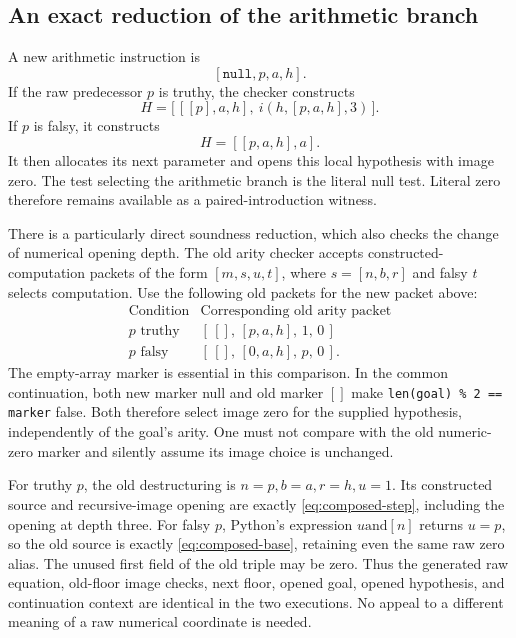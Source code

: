\subsection{An exact reduction of the arithmetic branch}

A new arithmetic instruction is
\[
                         [\mathtt{null},p,a,h].
\]
If the raw predecessor $p$ is truthy, the checker constructs
\[
 H=\bigl[\,[[p],a,h],\ i(h,[p,a,h],3)\,\bigr].
 \tag{C1}\label{eq:composed-step}
\]
If $p$ is falsy, it constructs
\[
                         H=[[p,a,h],a].
 \tag{C0}\label{eq:composed-base}
\]
It then allocates its next parameter and opens this local hypothesis
with image zero.  The test selecting the arithmetic branch is the
literal null test.  Literal zero therefore remains available as a
paired-introduction witness.

There is a particularly direct soundness reduction, which also checks
the change of numerical opening depth.  The old arity checker accepts
constructed-computation packets of the form
$[m,s,u,t]$, where $s=[n,b,r]$ and falsy $t$ selects computation.
Use the following old packets for the new packet above:
\[
\begin{array}{c|c}
\text{Condition}&\text{Corresponding old arity packet}\\\hline
p\text{ truthy}&[\,[],\,[p,a,h],\,1,\,0\,]\\
p\text{ falsy}&[\,[],\,[0,a,h],\,p,\,0\,].
\end{array}
\tag{Packet correspondence}\label{eq:packet-correspondence}
\]
The empty-array marker is essential in this comparison.  In the common
continuation, both new marker null and old marker $[]$ make
\texttt{len(goal) \% 2 == marker} false.  Both therefore select image
zero for the supplied hypothesis, independently of the goal's arity.
One must not compare with the old numeric-zero marker and silently
assume its image choice is unchanged.

For truthy $p$, the old destructuring is
$n=p,b=a,r=h,u=1$.  Its constructed source and recursive-image opening
are exactly \eqref{eq:composed-step}, including the opening at depth
three.  For falsy $p$, Python's expression $u\mathbin{\mathrm{and}}[n]$
returns $u=p$, so the old source is exactly
\eqref{eq:composed-base}, retaining even the same raw zero alias.
The unused first field of the old triple may be zero.  Thus the generated
raw equation, old-floor image checks, next floor, opened goal, opened
hypothesis, and continuation context are identical in the two
executions.  No appeal to a different meaning of a raw numerical
coordinate is needed.

